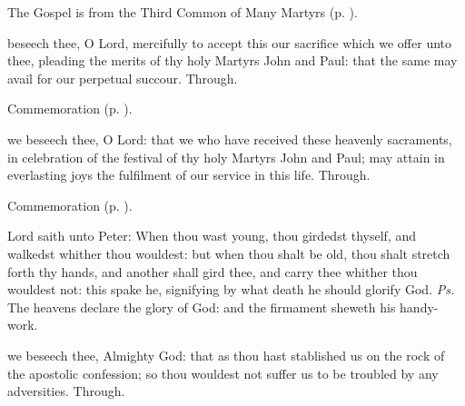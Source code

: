 \begin{rubric}
	The Gospel is from the Third Common of Many Martyrs (p. \pageref{CommonMartyrsIIIGospel}).
\end{rubric}


\secret
{} beseech thee, O Lord, mercifully to accept this our sacrifice which we offer unto thee, pleading the merits of thy holy Martyrs John and Paul: that the same may avail for our perpetual succour. Through.

\begin{rubric}
	Commemoration  (p. \pageref{JohnBaptistSecret}).
\end{rubric}


\postcommunion
{} we beseech thee, O Lord: that we who have received these heavenly sacraments, in celebration of the festival of thy holy Martyrs John and Paul; may attain in everlasting joys the fulfilment of our service in this life. Through.

\begin{rubric}
	Commemoration  (p. \pageref{JohnBaptistPC}).
\end{rubric}


\clearpage
{}

\introit
{} Lord saith unto Peter: When thou wast young, thou girdedst thyself, and walkedst whither thou wouldest: but when thou shalt be old, thou shalt stretch forth thy hands, and another shall gird thee, and carry thee whither thou wouldest not: this spake he, signifying by what death he should glorify God. \textit{Ps.} The heavens declare the glory of God: and the firmament sheweth his handy-work.

\collect
{} we beseech thee, Almighty God: that as thou hast stablished us on the rock of the apostolic confession; so thou wouldest not suffer us to be troubled by any adversities. Through.

